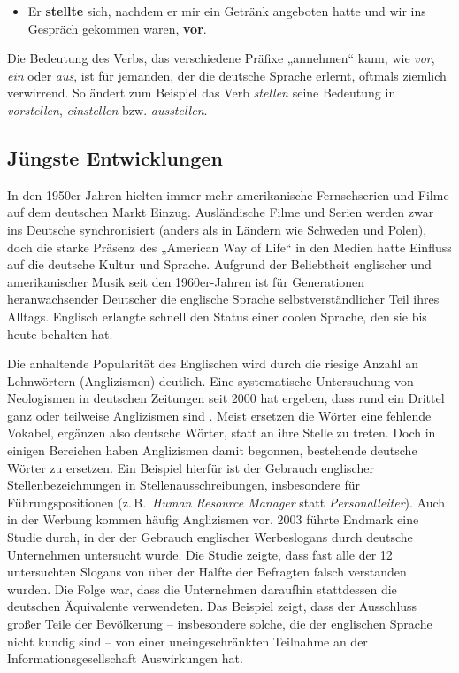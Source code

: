 \documentclass[]{../../metanetpaper}
\begin{document}
\begin{multicols}{2}
\begin{itemize}    
\item Er \textbf{stellte} sich, nachdem er mir ein Getränk angeboten hatte und wir ins Gespräch gekommen waren, \textbf{vor}. 
\end{itemize}
 
Die Bedeutung des Verbs, das verschiedene Präfixe „annehmen“ kann, wie \textit{vor}, \textit{ein} oder \textit{aus}, ist für jemanden, der die deutsche Sprache erlernt, oftmals ziemlich verwirrend. So ändert zum Beispiel das Verb \textit{stellen} seine Bedeutung in \textit{vorstellen}, \textit{einstellen} bzw. \textit{ausstellen}.


\subsection{Jüngste Entwicklungen}

In den 1950er-Jahren hielten immer mehr amerikanische Fernsehserien und Filme auf dem deutschen Markt Einzug. Ausländische Filme und Serien werden zwar ins Deutsche synchronisiert (anders als in Ländern wie Schweden und Polen), doch die starke Präsenz des „American Way of Life“ in den Medien hatte Einfluss auf die deutsche Kultur und Sprache. Aufgrund der Beliebtheit englischer und amerikanischer Musik seit den 1960er-Jahren ist für Generationen heranwachsender Deutscher die englische Sprache selbstverständlicher Teil ihres Alltags. Englisch erlangte schnell den Status einer coolen Sprache, den sie bis heute behalten hat. 

Die anhaltende Popularität des Englischen wird durch die riesige Anzahl an Lehnwörtern (Anglizismen) deutlich. Eine systematische Untersuchung von Neologismen in deutschen Zeitungen seit 2000 hat ergeben, dass rund ein Drittel ganz oder teilweise Anglizismen sind \cite{Lemni1}. Meist ersetzen die Wörter eine fehlende Vokabel, ergänzen also deutsche Wörter, statt an ihre Stelle zu treten. Doch in einigen Bereichen haben Anglizismen damit begonnen, bestehende deutsche Wörter zu ersetzen. Ein Beispiel hierfür ist der Gebrauch englischer Stellenbezeichnungen in Stellenausschreibungen, insbesondere für Führungspositionen (z.\,B.~\textit{Human Resource Manager} statt \textit{Personalleiter}). Auch in der Werbung kommen häufig Anglizismen vor. 2003 führte Endmark eine Studie durch, in der der Gebrauch englischer Werbeslogans durch deutsche Unternehmen untersucht wurde. Die Studie zeigte, dass fast alle der 12 untersuchten Slogans von über der Hälfte der Befragten falsch verstanden wurden. Die Folge war, dass die Unternehmen daraufhin stattdessen die deutschen Äquivalente verwendeten. Das Beispiel zeigt, dass der Ausschluss großer Teile der Bevölkerung -- insbesondere solche, die der englischen Sprache nicht kundig sind -- von einer uneingeschränkten Teilnahme an der Informationsgesellschaft Auswirkungen hat.


\end{multicols}
\end{document}

